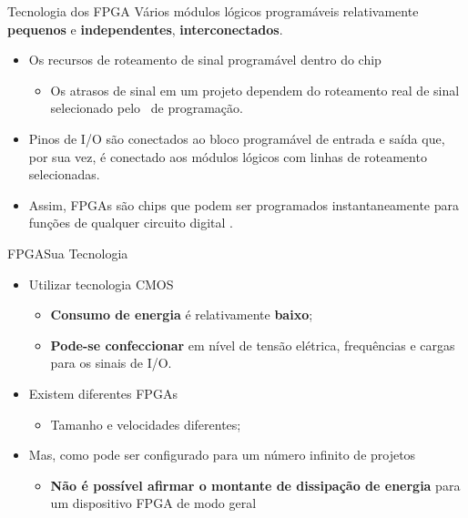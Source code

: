    
   \begin{frame}{Tecnologia dos FPGA} \vspace{-1em}
      Vários módulos lógicos programáveis relativamente \textbf{pequenos} e \textbf{independentes}, \textbf{interconectados}.
      
      \begin{itemize}
      \setlength{\itemsep}{1.2em}
      
      \item Os recursos de roteamento de sinal programável dentro do chip
      \begin{itemize}
         \item Os atrasos de sinal em um projeto dependem do roteamento real de sinal selecionado pelo \software\ de programação. 
      \end{itemize}
      
      \item Pinos de I/O são conectados ao bloco programável de entrada e saída que, por sua vez, é conectado aos módulos lógicos com linhas de roteamento selecionadas.
      \bigskip
      \item Assim, FPGAs são chips que podem ser programados instantaneamente para funções de qualquer circuito digital \cite{Choi2016}.   
      \end{itemize}
   \end{frame}


\begin{frame}{FPGA}{Sua Tecnologia \cite{tocci2003sistemas}} \vspace{-1em}
\begin{itemize}
\setlength{\itemsep}{0.8em}          
\item Utilizar tecnologia CMOS
\begin{itemize}
   \item \textbf{Consumo de energia} é relativamente \textbf{baixo};
   \item \textbf{Pode-se confeccionar} em nível de tensão elétrica, frequências e cargas para os sinais de I/O. 
\end{itemize}

\item Existem diferentes FPGAs
\begin{itemize}
   \item Tamanho e velocidades diferentes;
\end{itemize}

\item Mas, como pode ser configurado para um número infinito de projetos
\begin{itemize}
   \item \textbf{Não é possível afirmar o montante de dissipação de energia} para um dispositivo FPGA de modo geral
\end{itemize}

\end{itemize}
\end{frame}


